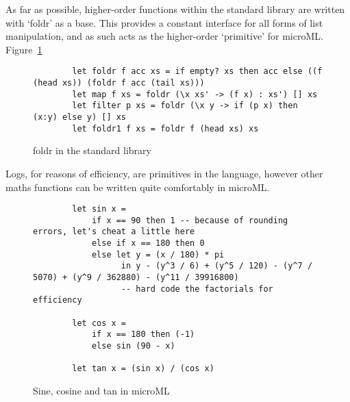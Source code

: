 As far as possible, higher-order functions within the standard library are written with `foldr' as a
base. This provides a constant interface for all forms of list manipulation, and as such acts as the
higher-order `primitive' for microML\@. Figure~\ref{fig:foldr}

\begin{figure}[H]
    \begin{verbatim}
        let foldr f acc xs = if empty? xs then acc else ((f (head xs)) (foldr f acc (tail xs)))
        let map f xs = foldr (\x xs' -> (f x) : xs') [] xs
        let filter p xs = foldr (\x y -> if (p x) then (x:y) else y) [] xs
        let foldr1 f xs = foldr f (head xs) xs
    \end{verbatim}
    \caption{foldr in the standard library}
\label{fig:foldr}
\end{figure}

Logs, for reasons of efficiency, are primitives in the language, however other maths functions can
be written quite comfortably in microML.

\begin{figure}
    \begin{verbatim}
        let sin x = 
            if x == 90 then 1 -- because of rounding errors, let's cheat a little here
            else if x == 180 then 0
            else let y = (x / 180) * pi 
                  in y - (y^3 / 6) + (y^5 / 120) - (y^7 / 5070) + (y^9 / 362880) - (y^11 / 39916800) 
                  -- hard code the factorials for efficiency

        let cos x = 
            if x == 180 then (-1)
            else sin (90 - x)

        let tan x = (sin x) / (cos x)
    \end{verbatim}
    \caption{Sine, cosine and tan in microML}
\label{fig:maths}
\end{figure}
